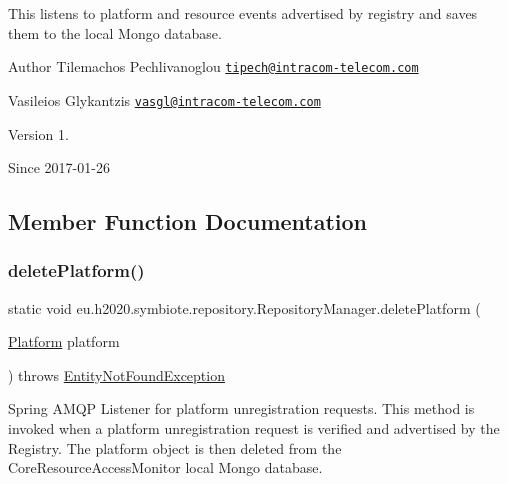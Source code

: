This listens to platform and resource events advertised by registry and saves them to the local Mongo database.

\begin{DoxyAuthor}{Author}
Tilemachos Pechlivanoglou \href{mailto:tipech@intracom-telecom.com}{\tt tipech@intracom-\/telecom.\+com} 

Vasileios Glykantzis \href{mailto:vasgl@intracom-telecom.com}{\tt vasgl@intracom-\/telecom.\+com} 
\end{DoxyAuthor}
\begin{DoxyVersion}{Version}
1. 
\end{DoxyVersion}
\begin{DoxySince}{Since}
2017-\/01-\/26 
\end{DoxySince}


\subsection{Member Function Documentation}
\mbox{\label{classeu_1_1h2020_1_1symbiote_1_1repository_1_1RepositoryManager_ab7f93e37749010ead2699037d54c4b0d}} 
\subsubsection{\texorpdfstring{delete\+Platform()}{deletePlatform()}}
{\footnotesize\ttfamily static void eu.\+h2020.\+symbiote.\+repository.\+Repository\+Manager.\+delete\+Platform (\begin{DoxyParamCaption}\item[{\hyperlink{classeu_1_1h2020_1_1symbiote_1_1model_1_1Platform}{Platform}}]{platform }\end{DoxyParamCaption}) throws \hyperlink{classeu_1_1h2020_1_1symbiote_1_1exception_1_1EntityNotFoundException}{Entity\+Not\+Found\+Exception}\hspace{0.3cm}{\ttfamily [static]}}

Spring A\+M\+QP Listener for platform unregistration requests. This method is invoked when a platform unregistration request is verified and advertised by the Registry. The platform object is then deleted from the Core\+Resource\+Access\+Monitor local Mongo database.


